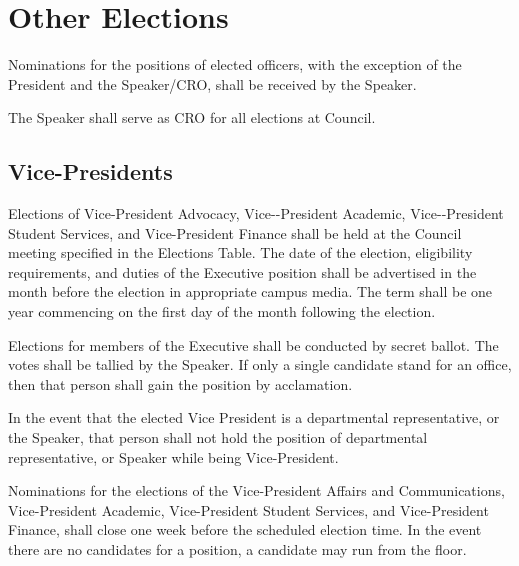 \newpage

\section{Other Elections}
\begin{longenum}[ label*=\thesubsection.\arabic*., align=left]
 \item Nominations for the positions of elected officers, with the exception of the President and the Speaker/CRO, shall be received by the Speaker. 
 
 \item The Speaker shall serve as CRO for all elections at Council.
\end{longenum}

\subsection{Vice-Presidents}
\begin{longenum}[ label*=\thesubsection.\arabic*., align=left]
	\item Elections of Vice-President Advocacy, Vice-­-President Academic, Vice-­-President Student Services, and Vice-President Finance shall be held at the Council meeting specified in the Elections Table. The date of the election, eligibility requirements, and duties of the Executive position shall be advertised in the month before the election in appropriate campus media. The term shall be one year commencing on the first day of the month following the election. 
	\item Elections for members of the Executive shall be conducted by secret ballot. The votes shall be tallied by the Speaker. If only a single candidate stand for an office, then that person shall gain the position by acclamation.
	\item In the event that the elected Vice President is a departmental representative, or the Speaker, that person shall not hold the position of departmental representative, or Speaker while being Vice-President. 
	\item Nominations for the elections of the Vice-President Affairs and Communications, Vice-President Academic, Vice-President Student Services, and Vice-President Finance, shall close one week before the scheduled election time. In the event there are no candidates for a position, a candidate may run from the floor.
\end{longenum}

